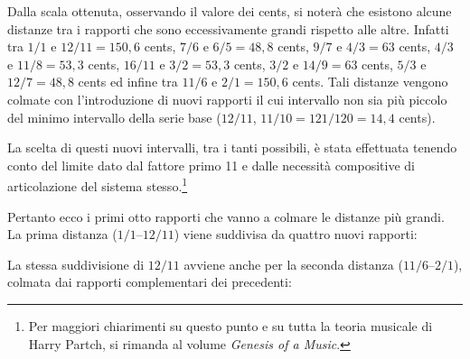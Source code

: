 Dalla scala ottenuta, osservando il valore dei cents, si noterà che esistono
alcune distanze tra i rapporti che sono eccessivamente grandi rispetto alle
altre. Infatti tra $1/1$ e $12/11 = 150{,}6$ cents, $7/6$ e $6/5 = 48{,}8$
cents, $9/7$ e $4/3 = 63$ cents, $4/3$ e $11/8 = 53{,}3$ cents, $16/11$ e
$3/2 = 53{,}3$ cents, $3/2$ e $14/9 = 63$ cents, $5/3$ e $12/7 = 48{,}8$ cents
ed infine tra $11/6$ e $2/1 = 150{,}6$ cents. Tali distanze vengono colmate con
l'introduzione di nuovi rapporti il cui intervallo non sia più piccolo del
minimo intervallo della serie base ($12/11$, $11/10 = 121/120 = 14{,}4$ cents).

La scelta di questi nuovi intervalli, tra i tanti possibili, è stata effettuata
tenendo conto del limite dato dal fattore primo 11 e dalle necessità
compositive di articolazione del sistema stesso.\footnote{Per maggiori
chiarimenti su questo punto e su tutta la teoria musicale di Harry Partch, si
rimanda al volume \emph{Genesis of a Music}.}

Pertanto ecco i primi otto rapporti che vanno a colmare le distanze più grandi.
La prima distanza ($1/1$--$12/11$) viene suddivisa da quattro nuovi rapporti:

\begin{figure}[htbp]
\centering
{}
\end{figure}

La stessa suddivisione di $12/11$ avviene anche per la seconda distanza
($11/6$--$2/1$), colmata dai rapporti complementari dei precedenti:

